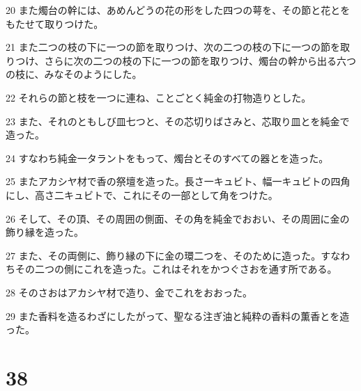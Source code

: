 \par 20 また燭台の幹には、あめんどうの花の形をした四つの萼を、その節と花とをもたせて取りつけた。
\par 21 また二つの枝の下に一つの節を取りつけ、次の二つの枝の下に一つの節を取りつけ、さらに次の二つの枝の下に一つの節を取りつけ、燭台の幹から出る六つの枝に、みなそのようにした。
\par 22 それらの節と枝を一つに連ね、ことごとく純金の打物造りとした。
\par 23 また、それのともしび皿七つと、その芯切りばさみと、芯取り皿とを純金で造った。
\par 24 すなわち純金一タラントをもって、燭台とそのすべての器とを造った。
\par 25 またアカシヤ材で香の祭壇を造った。長さ一キュビト、幅一キュビトの四角にし、高さ二キュビトで、これにその一部として角をつけた。
\par 26 そして、その頂、その周囲の側面、その角を純金でおおい、その周囲に金の飾り縁を造った。
\par 27 また、その両側に、飾り縁の下に金の環二つを、そのために造った。すなわちその二つの側にこれを造った。これはそれをかつぐさおを通す所である。
\par 28 そのさおはアカシヤ材で造り、金でこれをおおった。
\par 29 また香料を造るわざにしたがって、聖なる注ぎ油と純粋の香料の薫香とを造った。

\chapter{38}

